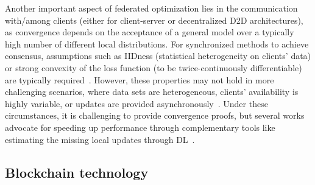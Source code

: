 \documentclass[10pt,journal,compsoc]{IEEEtran}
\begin{document}
Another important aspect of federated optimization lies in the communication with/among clients (either for client-server or decentralized D2D architectures), as convergence depends on the acceptance of a general model over a typically high number of different local distributions. For synchronized methods to achieve consensus, assumptions such as IIDness (statistical heterogeneity on clients' data) or strong convexity of the loss function (to be twice-continuously differentiable) are typically required~\cite{chen2020convergence,li2018federated,wang2019adaptive}. However, these properties may not hold in more challenging scenarios, where data sets are heterogeneous, clients' availability is highly variable, or updates are provided asynchronously~\cite{xie2019asynchronous,chen2020asynchronous}. Under these circumstances, it is challenging to provide convergence proofs, but several works advocate for speeding up performance through complementary tools like estimating the missing local updates through DL~\cite{chen2020convergence}. %

\subsection{Blockchain technology}
\end{document}

